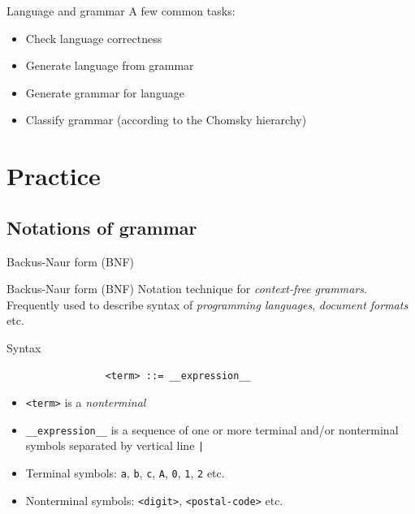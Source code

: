 \documentclass{beamer}
\begin{document}
\begin{frame}{Language and grammar}
A few common tasks:


\begin{itemize}
	\item Check language correctness
	\item Generate language from grammar
	\item Generate grammar for language
	\item Classify grammar (according to the Chomsky hierarchy)
\end{itemize}
\end{frame}

\section{Practice}

\subsection{Notations of grammar}

\begin{frame}[fragile]{Backus-Naur form (BNF)}

\begin{block}{Backus-Naur form (BNF)}
Notation technique for \textit{context-free grammars}. Frequently used to describe syntax of \textit{programming languages}, \textit{document formats} etc.
\end{block}


\begin{block}{Syntax}
\begin{verbatim}
                 <term> ::= __expression__
\end{verbatim}
\vskip -0.5cm
\begin{itemize}
\item \verb|<term>| is a \textit{nonterminal}
\item \verb|__expression__| is a sequence of one or more terminal and/or nonterminal symbols separated by vertical line \verb$|$
\item Terminal symbols: \verb|a|, \verb|b|, \verb|c|, \verb|A|, \verb|0|, \verb|1|, \verb|2| etc.
\item Nonterminal symbols: \verb|<digit>|, \verb|<postal-code>| etc.
\end{itemize}
\end{block}

\end{frame}
\end{document}
